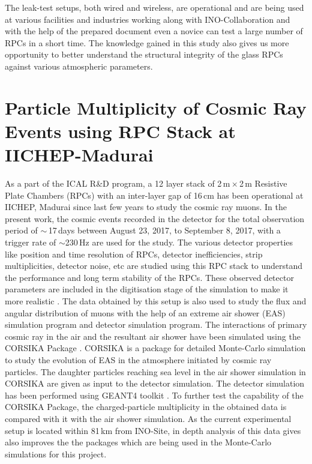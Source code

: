 \documentclass[a4paper,12pt,twoside,openany]{article}
\begin{document}
The leak-test setups, both wired and wireless, are operational and are
being used at various facilities and industries working along with
INO-Collaboration and with the help of the prepared document even a
novice can test a large number of RPCs in a short time. The knowledge
gained in this study also gives us more opportunity to better
understand the structural integrity of the glass RPCs against various
atmospheric parameters.

\section{Particle Multiplicity of Cosmic Ray Events using RPC Stack at IICHEP-Madurai}

As a part of the ICAL R\&D program, a 12 layer stack of
2\,m\,$\times$\,2\,m Resistive Plate Chambers (RPCs) with an
inter-layer gap of 16\,cm has been operational at IICHEP, Madurai
since last few years to study the cosmic ray muons. In the present
work, the cosmic events recorded in the detector for the total
observation period of $\sim$\,17\,days between August 23, 2017, to
September 8, 2017, with a trigger rate of $\sim$230\,Hz are used for
the study. The various detector properties like position and time
resolution of RPCs, detector inefficiencies, strip multiplicities,
detector noise, etc are studied using this RPC stack to understand the
performance and long term stability of the RPCs. These observed
detector parameters are included in the digitisation stage of the
simulation to make it more realistic \cite{pethu1}. The data obtained
by this setup is also used to study the flux and angular distribution
of muons with the help of an extreme air shower (EAS) simulation
program and detector simulation program. The interactions of primary
cosmic ray in the air and the resultant air shower have been simulated
using the CORSIKA Package \cite{corsika763}. CORSIKA is a package for
detailed Monte-Carlo simulation to study the evolution of EAS in the
atmosphere initiated by cosmic ray particles. The daughter particles
reaching sea level in the air shower simulation in CORSIKA are given
as input to the detector simulation. The detector simulation has been
performed using GEANT4 toolkit \cite{geant4}. To further test the
capability of the CORSIKA Package, the charged-particle multiplicity
in the obtained data is compared with it with the air shower
simulation. As the current experimental setup is located within 81\,km
from INO-Site, in depth analysis of this data gives also improves the
the packages which are being used in the Monte-Carlo simulations for
this project.
\end{document}
